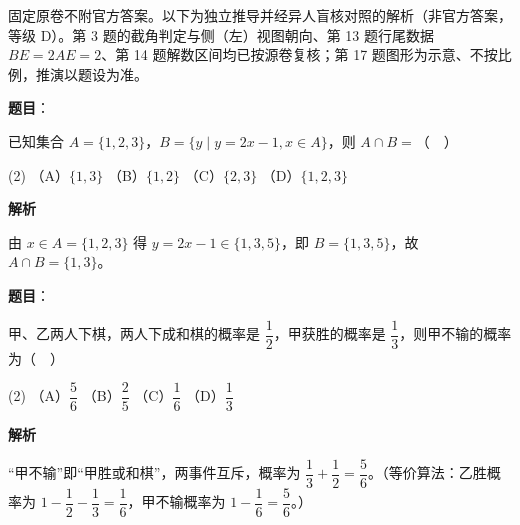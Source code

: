 

\begin{gktip}
固定原卷不附官方答案。以下为独立推导并经异人盲核对照的解析（非官方答案，等级 D）。第 3 题的截角判定与侧（左）视图朝向、第 13 题行尾数据 \(BE=2AE=2\)、第 14 题解数区间均已按源卷复核；第 17 题图形为示意、不按比例，推演以题设为准。
\end{gktip}

\begin{answer}

\textbf{题目}：

已知集合 \(A=\{1,2,3\}\)，\(B=\{y\mid y=2x-1,x\in A\}\)，则 \(A\cap B=\)（　）

\begin{gkopts}(2)
\task （A）\(\{1,3\}\)
\task （B）\(\{1,2\}\)
\task （C）\(\{2,3\}\)
\task （D）\(\{1,2,3\}\)
\end{gkopts}

\textbf{解析}

由 \(x\in A=\{1,2,3\}\) 得 \(y=2x-1\in\{1,3,5\}\)，即 \(B=\{1,3,5\}\)，故 \(A\cap B=\{1,3\}\)。


\end{answer}
\begin{answer}

\textbf{题目}：

甲、乙两人下棋，两人下成和棋的概率是 \(\dfrac{1}{2}\)，甲获胜的概率是 \(\dfrac{1}{3}\)，则甲不输的概率为（　）

\begin{gkopts}(2)
\task （A）\(\dfrac{5}{6}\)
\task （B）\(\dfrac{2}{5}\)
\task （C）\(\dfrac{1}{6}\)
\task （D）\(\dfrac{1}{3}\)
\end{gkopts}

\textbf{解析}

“甲不输”即“甲胜或和棋”，两事件互斥，概率为 \(\dfrac{1}{3}+\dfrac{1}{2}=\dfrac{5}{6}\)。（等价算法：乙胜概率为 \(1-\dfrac{1}{2}-\dfrac{1}{3}=\dfrac{1}{6}\)，甲不输概率为 \(1-\dfrac{1}{6}=\dfrac{5}{6}\)。）


\end{answer}
